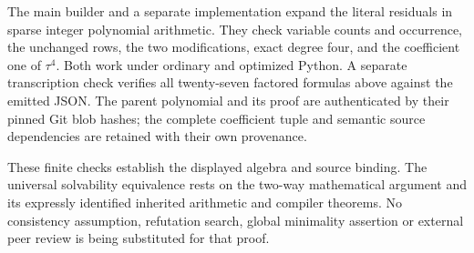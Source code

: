 The main builder and a separate implementation expand the literal
residuals in sparse integer polynomial arithmetic. They check variable
counts and occurrence, the unchanged rows, the two modifications, exact
degree four, and the coefficient one of $\tau^4$. Both work under
ordinary and optimized Python. A separate transcription check verifies
all twenty-seven factored formulas above against the emitted JSON.
The parent polynomial and its proof are authenticated by their pinned
Git blob hashes; the complete coefficient tuple and semantic source
dependencies are retained with their own provenance.

These finite checks establish the displayed algebra and source binding.
The universal solvability equivalence rests on the two-way mathematical
argument and its expressly identified inherited arithmetic and compiler
theorems. No consistency assumption, refutation search, global
minimality assertion or external peer review is being substituted for
that proof.
